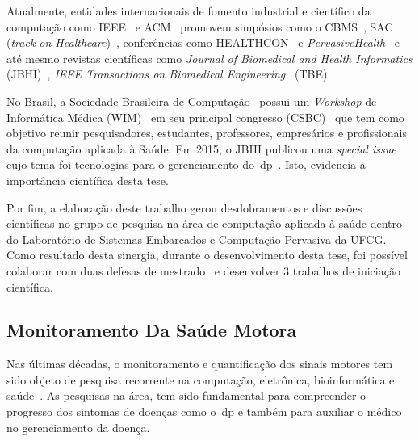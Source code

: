 
Atualmente, entidades internacionais de fomento industrial e científico da computação como IEEE~\cite{ieee2016} e ACM~\cite{acm2016} promovem simpósios como o CBMS~\cite{cbms2016}, SAC (\textit{track on Healthcare})~\cite{sachealth2016}, conferências como HEALTHCON~\cite{healthcon2016} e \textit{PervasiveHealth}~\cite{pervasivehealth2016} e até mesmo revistas científicas como \textit{Journal of Biomedical and Health Informatics} (JBHI)~\cite{jbhi2016}, \textit{IEEE Transactions on Biomedical Engineering}~\cite{tbe2016} (TBE). 

No Brasil, a Sociedade Brasileira de Computação~\cite{sbc2016} possui um \textit{Workshop} de Informática Médica (WIM)~\cite{wim2016} em seu principal congresso (CSBC)~\cite{csbc2016} que tem como objetivo reunir pesquisadores, estudantes, professores, empresários e profissionais da computação aplicada à Saúde. Em 2015, o JBHI publicou uma \textit{special issue} cujo tema foi tecnologias para o gerenciamento do~\ac{dp}~\cite{specjbhi2015}. Isto, evidencia a importância científica desta tese. %

Por fim, a elaboração deste trabalho gerou desdobramentos e discussões científicas no grupo de pesquisa na área de computação aplicada à saúde dentro do Laboratório de Sistemas Embarcados e Computação Pervasiva da UFCG. Como resultado desta sinergia, durante o desenvolvimento desta tese, foi possível colaborar com duas defesas de mestrado~\cite{antonio2013,gustavo2014} e desenvolver 3 trabalhos de iniciação científica. 


\subsection{Monitoramento Da Saúde Motora}
Nas últimas décadas, o monitoramento e quantificação dos sinais motores tem sido objeto de pesquisa recorrente na computação, eletrônica, bioinformática e saúde~\cite{reviewassesenspark2015}. As pesquisas na área, tem sido fundamental para compreender o progresso dos sintomas de doenças como o~\ac{dp} e também para auxiliar o médico no gerenciamento da doença.

